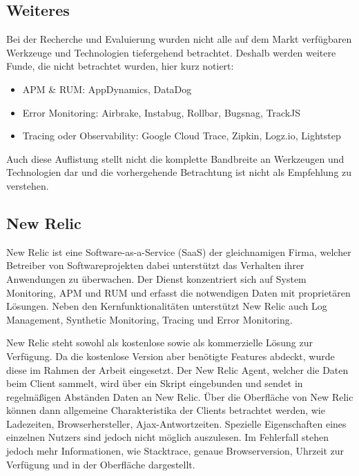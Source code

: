 \subsection{Weiteres}
\label{sec:weitere-werkzeuge}

Bei der Recherche und Evaluierung wurden nicht alle auf dem Markt verfügbaren Werkzeuge und Technologien tiefergehend betrachtet. Deshalb werden weitere Funde, die nicht betrachtet wurden, hier kurz notiert:

\begin{itemize}
	\item APM \& RUM: AppDynamics, DataDog
	\item Error Monitoring: Airbrake, Instabug, Rollbar, Bugsnag, TrackJS
	\item Tracing oder Observability: Google Cloud Trace, Zipkin, Logz.io, Lightstep
\end{itemize}

Auch diese Auflistung stellt nicht die komplette Bandbreite an Werkzeugen und Technologien dar und die vorhergehende Betrachtung ist nicht als Empfehlung zu verstehen.

\subsection{New Relic}

New Relic \cite{NewRelic} ist eine Software-as-a-Service (SaaS) der gleichnamigen Firma, welcher Betreiber von Softwareprojekten dabei unterstützt das Verhalten ihrer Anwendungen zu überwachen. Der Dienst konzentriert sich auf System Monitoring, APM und RUM und erfasst die notwendigen Daten mit proprietären Lösungen. Neben den Kernfunktionalitäten unterstützt New Relic auch Log Management, Synthetic Monitoring, Tracing und Error Monitoring.


New Relic steht sowohl als kostenlose sowie als kommerzielle Lösung zur Verfügung. Da die kostenlose Version aber benötigte Features abdeckt, wurde diese im Rahmen der Arbeit eingesetzt. Der New Relic Agent, welcher die Daten beim Client sammelt, wird über ein Skript eingebunden und sendet in regelmäßigen Abständen Daten an New Relic. Über die Oberfläche von New Relic können dann allgemeine Charakteristika der Clients betrachtet werden, wie Ladezeiten, Browserhersteller, Ajax-Antwortzeiten. Spezielle Eigenschaften eines einzelnen Nutzers sind jedoch nicht möglich auszulesen. Im Fehlerfall stehen jedoch mehr Informationen, wie Stacktrace, genaue Browserversion, Uhrzeit zur Verfügung und in der Oberfläche dargestellt.

